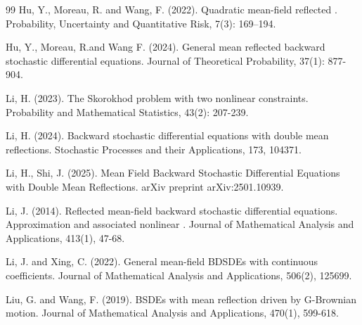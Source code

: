 \documentclass[10pt]{article}%
\numberwithin{equation}{section}
\begin{document}
\begin{thebibliography}{99}
 Hu, Y., Moreau, R. and Wang, F. (2022). Quadratic mean-field reflected . Probability, Uncertainty and Quantitative Risk, 7(3): 169–194.

 Hu, Y., Moreau, R.and Wang F. (2024). General mean reflected backward stochastic differential equations. Journal of Theoretical Probability, 37(1): 877-904.




 Li, H. (2023).  The Skorokhod problem with two nonlinear constraints. Probability and Mathematical Statistics, 43(2): 207-239.
	
 Li, H. (2024). Backward stochastic differential equations with double mean reflections. Stochastic Processes and their Applications, 173, 104371.

 Li, H., Shi, J. (2025). Mean Field Backward Stochastic Differential Equations with Double Mean Reflections. arXiv preprint arXiv:2501.10939.

 Li, J. (2014). Reflected mean-field backward stochastic differential equations. Approximation and associated nonlinear . Journal of Mathematical Analysis and Applications, 413(1), 47-68.



  Li, J. and Xing, C. (2022). General mean-field BDSDEs with continuous coefficients. Journal of Mathematical Analysis and Applications, 506(2), 125699.

 Liu, G. and Wang, F. (2019). BSDEs with mean reflection driven by G-Brownian motion. Journal of Mathematical Analysis and Applications, 470(1), 599-618.
 

\end{thebibliography}
\end{document}
